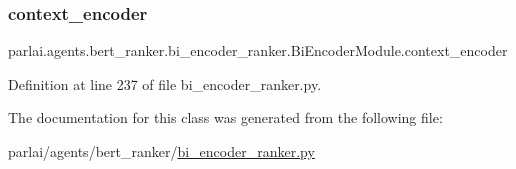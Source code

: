 \subsubsection{\texorpdfstring{context\+\_\+encoder}{context\_encoder}}
{\footnotesize\ttfamily parlai.\+agents.\+bert\+\_\+ranker.\+bi\+\_\+encoder\+\_\+ranker.\+Bi\+Encoder\+Module.\+context\+\_\+encoder}



Definition at line 237 of file bi\+\_\+encoder\+\_\+ranker.\+py.



The documentation for this class was generated from the following file\+:\begin{DoxyCompactItemize}
\item 
parlai/agents/bert\+\_\+ranker/\hyperlink{bi__encoder__ranker_8py}{bi\+\_\+encoder\+\_\+ranker.\+py}\end{DoxyCompactItemize}
